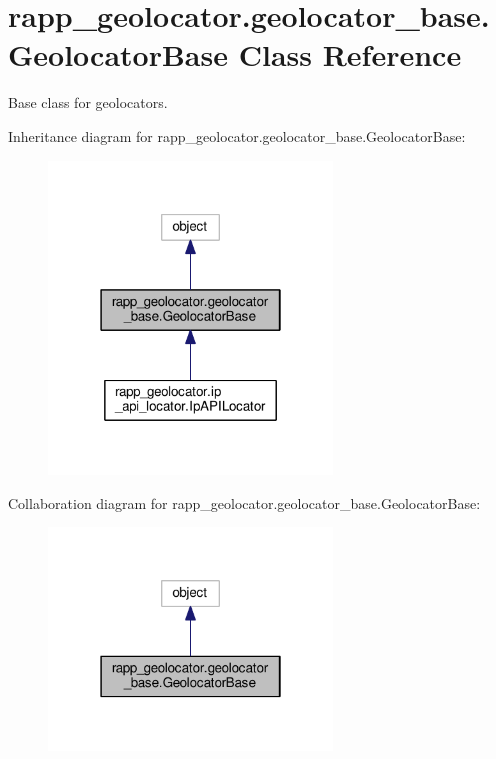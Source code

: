 \hypertarget{classrapp__geolocator_1_1geolocator__base_1_1GeolocatorBase}{\section{rapp\-\_\-geolocator.\-geolocator\-\_\-base.\-Geolocator\-Base Class Reference}
\label{classrapp__geolocator_1_1geolocator__base_1_1GeolocatorBase}
}


Base class for geolocators.  




Inheritance diagram for rapp\-\_\-geolocator.\-geolocator\-\_\-base.\-Geolocator\-Base\-:
\nopagebreak
\begin{figure}[H]
\begin{center}
\leavevmode
\includegraphics[width=214pt]{classrapp__geolocator_1_1geolocator__base_1_1GeolocatorBase__inherit__graph}
\end{center}
\end{figure}


Collaboration diagram for rapp\-\_\-geolocator.\-geolocator\-\_\-base.\-Geolocator\-Base\-:
\nopagebreak
\begin{figure}[H]
\begin{center}
\leavevmode
\includegraphics[width=214pt]{classrapp__geolocator_1_1geolocator__base_1_1GeolocatorBase__coll__graph}
\end{center}
\end{figure}
